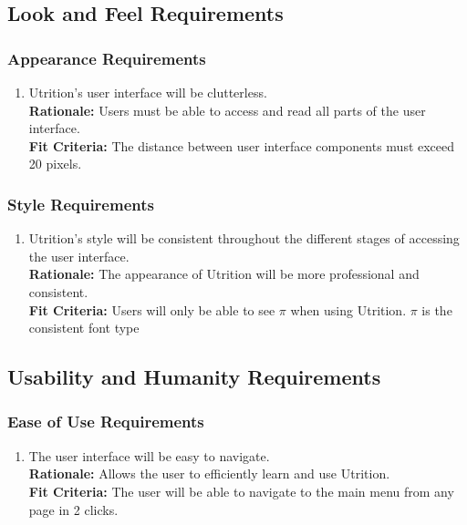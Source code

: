 \documentclass[12pt]{article}
\begin{document}
\subsection{Look and Feel Requirements}

\subsubsection{Appearance Requirements}

\begin{enumerate}[{LF}1. ]
	\item Utrition’s user interface will be clutterless.\\
	\textbf{Rationale:} Users must be able to access and read all parts of the user interface. \\
	\textbf{Fit Criteria:} The distance between user interface components must exceed 20 pixels.
\end{enumerate}

\subsubsection{Style Requirements}

\begin{enumerate}[{LF}2. ]
	\item Utrition’s style will be consistent throughout the different stages of accessing the user interface.\\
	\textbf{Rationale:} The appearance of Utrition will be more professional and consistent. \\
	\textbf{Fit Criteria:} Users will only be able to see $\pi$ when using Utrition. $\pi$ is the consistent font type
\end{enumerate}

\subsection{Usability and Humanity Requirements}

\subsubsection{Ease of Use Requirements}

\begin{enumerate}[{UH}1. ]
	\item The user interface will be easy to navigate. \\
	\textbf{Rationale:} Allows the user to efficiently learn and use Utrition.\\
	\textbf{Fit Criteria:} The user will be able to navigate to the main menu from any page in 2 clicks.
\end{enumerate}
\end{document}
